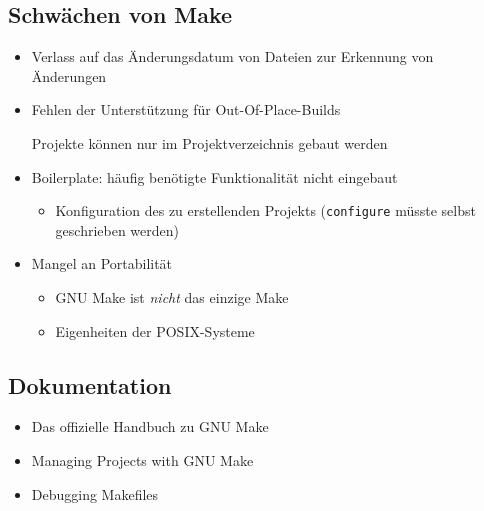\subsection{Schwächen von Make}
\begin{frame}
	\begin{itemize}
		\item Verlass auf das Änderungsdatum von Dateien zur Erkennung von Änderungen
		\item Fehlen der Unterstützung für Out-Of-Place-Builds

			Projekte können nur im Projektverzeichnis gebaut werden
		\item Boilerplate: häufig benötigte Funktionalität nicht eingebaut
			\begin{itemize}
				\item Konfiguration des zu erstellenden Projekts (\texttt{configure} müsste selbst geschrieben werden)
			\end{itemize}
		\item Mangel an Portabilität
			\begin{itemize}
				\item GNU Make ist \emph{nicht} das einzige Make
				\item Eigenheiten der POSIX-Systeme
			\end{itemize}
	\end{itemize}
\end{frame}

\subsection{Dokumentation}
\begin{frame}
	\begin{itemize}
	\item Das offizielle Handbuch zu GNU Make \cite{GNU_Make_manual}
	\item Managing Projects with GNU Make \cite{OreillyMake}
	\item Debugging Makefiles \cite{DobbsDebuggingMakefiles}
	\end{itemize}
\end{frame}
